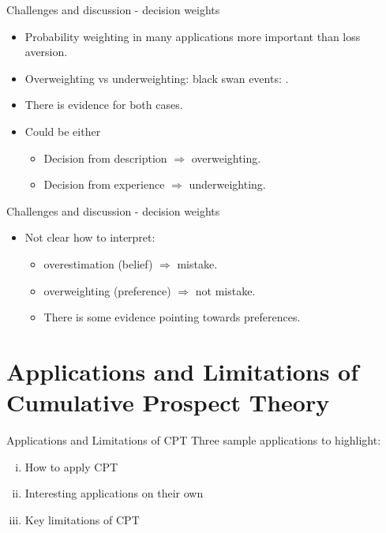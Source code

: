       \begin{frame}{Challenges and discussion - decision weights}
    \begin{itemize}
        \item Probability weighting in many applications more important than loss aversion.\medskip
        \item Overweighting vs underweighting: black swan events: \citet{Taleb2010}.\medskip
        \item There is evidence for both cases.\medskip
        \item Could be either \medskip
        \begin{itemize}
        \item Decision from description $\Rightarrow$ overweighting.\smallskip
        \item Decision from experience $\Rightarrow$ underweighting.\smallskip
        \end{itemize}
    \end{itemize}
\end{frame}


\begin{frame}{Challenges and discussion - decision weights}
    \begin{itemize}
        \item Not clear how to interpret:\medskip
          \begin{itemize}
        \item overestimation (belief) $\Rightarrow$ mistake.\smallskip
        \item overweighting (preference) $\Rightarrow$ not mistake.\smallskip
       \item There is some evidence pointing towards preferences.\medskip
           \end{itemize}
    \end{itemize}
\end{frame}

\section{Applications and Limitations of Cumulative Prospect Theory}



\begin{frame}{Applications and Limitations of CPT}
    Three sample applications to highlight:\bigskip
        \begin{enumerate}[i)]
            \item How to apply CPT\bigskip
            \item Interesting applications on their own\bigskip
            \item Key limitations of CPT\bigskip
        \end{enumerate}
    \end{frame}

